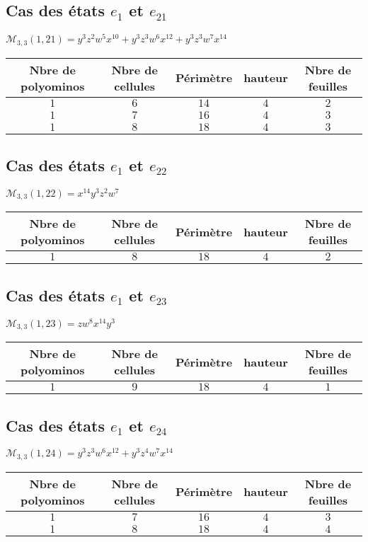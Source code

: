 \subsection*{Cas des états $e_{1}$ et $e_{21}$ }
$\mathcal{M}_{3,3}(1,21)=y^3z^2w^5x^{10}+y^3z^3w^6x^{12}+y^3z^3w^7x^{14}$\\
\begin{tabular}{|c|c|c|c|c|}
 \hline
  Nbre de polyominos & Nbre de cellules & Périmètre & hauteur &Nbre de feuilles\\
 \hline
 $1$ & $6$ & $14$ & $4$ &$2$\\
 \hline
 $1$ & $7$ & $16$ & $4$ &$3$\\
 \hline
  $1$ & $8$ & $18$ & $4$ &$3$\\
 \hline
\end{tabular}
\subsection*{Cas des états $e_{1}$ et $e_{22}$ }
$\mathcal{M}_{3,3}(1,22)=x^{14}y^3z^2w^7$\\
\begin{tabular}{|c|c|c|c|c|}
 \hline
  Nbre de polyominos & Nbre de cellules & Périmètre & hauteur &Nbre de feuilles\\
 \hline
 $1$ & $8$ & $18$ & $4$ &$2$\\
 \hline
\end{tabular}
\subsection*{Cas des états $e_{1}$ et $e_{23}$ }
$\mathcal{M}_{3,3}(1,23)=zw^8x^{14}y^3
$\\
\begin{tabular}{|c|c|c|c|c|}
 \hline
  Nbre de polyominos & Nbre de cellules & Périmètre & hauteur &Nbre de feuilles\\
 \hline
 $1$ & $9$ & $18$ & $4$ &$1$\\
 \hline
\end{tabular}
\subsection*{Cas des états $e_{1}$ et $e_{24}$ }
$\mathcal{M}_{3,3}(1,24)=y^3z^3w^6x^{12}+y^3z^4w^7x^{14}
$\\
\begin{tabular}{|c|c|c|c|c|}
 \hline
  Nbre de polyominos & Nbre de cellules & Périmètre & hauteur &Nbre de feuilles\\
 \hline
 $1$ & $7$ & $16$ & $4$ &$3$\\
 \hline
 $1$ & $8$ & $18$ & $4$ &$4$\\
 \hline
\end{tabular}
